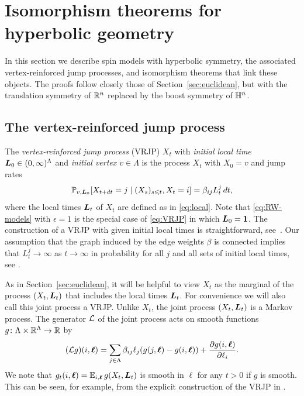 \documentclass[11pt,a4paper]{article}
\begin{document}
\section{Isomorphism theorems for hyperbolic geometry}
\label{sec:hyperbolic}


In this section we describe spin models with hyperbolic symmetry, the
associated vertex-reinforced jump processes, and isomorphism theorems
that link these objects. The proofs follow closely those of
Section~\ref{sec:euclidean}, but with the translation symmetry of
$\mathbb{R}^{n}$ replaced by the boost symmetry of $\mathbb{H}^{n}$.

\subsection{The vertex-reinforced jump process}
\label{sec:vert-reinf-jump}

The \emph{vertex-reinforced jump process} (VRJP) $X_{t}$ with
\emph{initial local time $\boldsymbol{L}_{0}\in (0,\infty)^{\Lambda}$} and
\emph{initial vertex $v\in\Lambda$} is the process $X_{t}$ with
$X_{0}=v$ and jump rates
\begin{equation}
  \label{eq:VRJP}
  \P_{v,\V{L}_{0}}\cb{X_{t+dt}=j \mid (X_{s})_{s\leq t}, X_{t}=i} =
  \beta_{ij}L^{j}_{t}\,dt,
\end{equation}
where the local times $\boldsymbol{L}_{t}$ of $X_{t}$ are defined as in
\eqref{eq:local}.  Note that \eqref{eq:RW-models} with $\epsilon=1$ is
the special case of \eqref{eq:VRJP} in which $\boldsymbol{L}_{0}=\boldsymbol{1}$.  The
construction of a VRJP with given initial local times is
straightforward, see~\cite[Section~2]{MR2027294}.
Our assumption that the graph induced by the edge weights $\beta$ is connected
implies that $L^{j}_{t}\to\infty$ as $t\to\infty$ in probability for
all $j$ and all sets of initial local times, see
\cite[Lemma~1]{MR2027294}.


As in Section~\ref{sec:euclidean}, it will be helpful to view $X_{t}$
as the marginal of the process $(X_{t},\boldsymbol{L}_{t})$ that includes the
local times $\boldsymbol{L}_{t}$. For convenience we will also call this joint
process a VRJP. Unlike $X_{t}$, the joint process $(X_{t},\boldsymbol{L}_{t})$
is a Markov process.  The generator $\mathcal L$ of the joint process
acts on smooth functions $g\colon\Lambda\times\mathbb{R}^{\Lambda}\to\mathbb{R}$ by
\begin{equation}
  \label{eq:VRJP-generator}
  (\mathcal L g)(i,\boldsymbol{\ell}) = \sum_{j\in\Lambda}\beta_{ij}\ell_{j}
  (g(j,\boldsymbol{\ell}) - g(i,\boldsymbol{\ell})) 
  + \frac{\partial g(i,\boldsymbol{\ell})}{\partial \ell_{i}}.
\end{equation}
We note that $g_t(i,\boldsymbol{\ell})=\mathbb{E}_{i,\boldsymbol{\ell}}\,g(X_t,\boldsymbol{L}_t)$ is smooth in $\ell$
for any $t>0$ if $g$ is smooth.  This can be seen, for example, from
the explicit construction of the VRJP in \cite[Section~2]{MR2027294}.
\end{document}
